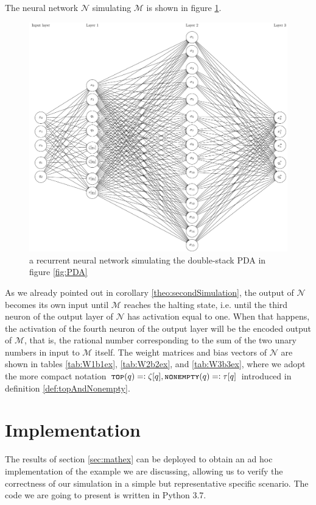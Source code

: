 \documentclass{book}
\newcommand{\eqdef}{=\vcentcolon}
\newcommand{\nonempty}{\textsc{\texttt{nonempty}}}
\newcommand{\tos}{\textsc{\texttt{top}}}
\theoremstyle{definition}
\theoremstyle{plain}
\theoremstyle{plain}
\theoremstyle{remark}
\theoremstyle{plain}
\begin{document}
	The neural network $\mathcal{N}$ simulating $\mathcal{M}$ is shown in figure \ref{fig:exampleNet}. 
	\begin{figure}[p]
		\centering
		\includegraphics[width=\textwidth]{exampleNet.pdf}
		\caption{a recurrent neural network simulating the double-stack PDA in figure \ref{fig:PDA}}
		\label{fig:exampleNet}
	\end{figure}
	As we already pointed out in corollary \ref{theo:secondSimulation}, the output of $\mathcal{N}$ becomes its own input until $\mathcal{M}$ reaches the halting state, i.e. until the third neuron of the output layer of $\mathcal{N}$ has activation equal to one. When that happens, the activation of the fourth neuron of the output layer will be the encoded output of $\mathcal{M}$, that is, the rational number corresponding to the sum of the two unary numbers in input to $\mathcal{M}$ itself. The weight matrices and bias vectors of $\mathcal{N}$ are shown in tables \ref{tab:W1b1ex}, \ref{tab:W2b2ex}, and \ref{tab:W3b3ex}, where we adopt the more compact notation $\tos(q)\eqdef\zeta[q], \nonempty(q)\eqdef\tau[q]$ introduced in definition \ref{def:topAndNonempty}.
	
	
	
	
	\section{Implementation}
	The results of section \ref{sec:mathex} can be deployed to obtain an ad hoc implementation of the example we are discussing, allowing us to verify the correctness of our simulation in a simple but representative specific scenario. The code we are going to present is written in Python 3.7. 
	
\end{document}

